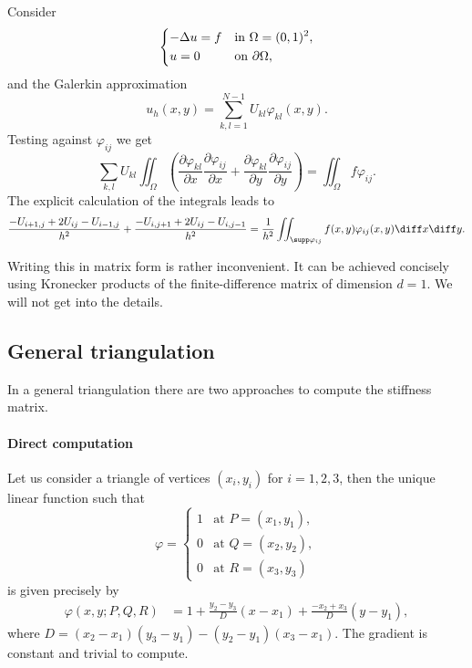 Consider
$$
    \begin{dcases}
        -\Delta u = f & \text{in } \Omega = (0,1)^2, \\
        u = 0         & \text{on } \partial \Omega,
    \end{dcases}
$$
and the Galerkin approximation
$$
    u_h(x,y) = \sum_{k,l=1}^{N-1} U_{kl} \varphi_{kl} (x,y).
$$
Testing against $\varphi_{ij}$ we get
$$
    \sum_{k,l} U_{kl} \iint_\Omega  \left( \frac{\partial \varphi_{kl}}{\partial x} \frac{\partial \varphi_{ij}}{\partial x}  + \frac{\partial \varphi_{kl}}{\partial y} \frac{\partial \varphi_{ij}}{\partial y}  \right) = \iint_\Omega f \varphi_{ij}  .
$$
The explicit calculation of the integrals leads to
$$
    \frac{-U_{i+1,j} + 2 U_{ij} - U_{i-1,j}}{h^2} + \frac{-U_{i,j+1} + 2 U_{ij} - U_{i,j-1}}{h^2} = \frac{1}{h^2} \iint_{  \supp \varphi_{ij}  } f (x,y) \varphi_{ij} (x,y) \diff x \diff y .
$$

Writing this in matrix form is rather inconvenient. It can be achieved concisely using Kronecker products of the finite-difference matrix of dimension $d=1$. We will not get into the details.


\subsection{General triangulation}

In a general triangulation there are two approaches to compute the stiffness matrix.

\paragraph{Direct computation}
Let us consider a triangle of vertices $(x_i,y_i)$ for $i=1, 2, 3$, then the unique linear function such that
$$
    \varphi =
    \begin{cases}
        1 & \text{at } P = (x_1,y_1), \\
        0 & \text{at } Q = (x_2,y_2), \\
        0 & \text{at } R = (x_3,y_3)
    \end{cases}
$$
is given precisely by
$$ \begin{aligned}
        \varphi(x,y; P, Q, R) & = 1
        +
        \frac{y_{2} - y_{3}}{D}\left(x - x_{1}\right)
        + \frac{- x_{2} + x_{3}}{D} \left(y - y_{1}\right) ,
    \end{aligned}
$$
where $D = (x_2-x_1)(y_3-y_1) - (y_2-y_1) (x_3-x_1)$.
The gradient is constant and trivial to compute.

